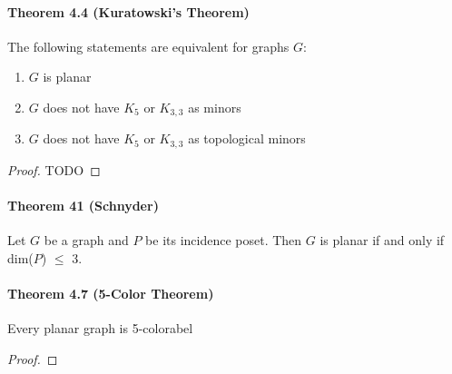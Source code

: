 \paragraph{Theorem 4.4 (Kuratowski's Theorem)} The following statements are 
equivalent for graphs $ G$:
\begin{enumerate}
    \item $ G $ is planar 
    \item $ G $ does not have $ K_5 $ or $ K_{3,3} $ as minors
    \item $ G $ does not have $ K_5 $ or $ K_{3,3} $ as topological minors
\end{enumerate}
\begin{proof}
    TODO
\end{proof}


\paragraph{Theorem 41 (Schnyder)} Let $ G $ be a graph and $ P $ be its incidence
poset. Then $ G $ is planar if and only if dim($P$) $\leq$ 3.

\paragraph{Theorem 4.7 (5-Color Theorem)} Every planar graph is 5-colorabel
\begin{proof}
    
\end{proof}